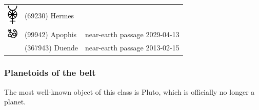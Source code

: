 \documentclass[british,final,landscape]{scrartcl}
\begin{document}
\begin{refsection}
\begin{supertabular}{p{0.3\textwidth}p{0.34\textwidth}p{0.34\textwidth}}
    \includegraphics[width=5mm]{Astrology/Hermes}     & (69230) Hermes    & \\
    \includegraphics[width=5mm]{Astrology/Apophis}    & (99942) Apophis   & near-earth passage 2029-04-13 \\
                                                      & (367943) Duende   & near-earth passage 2013-02-15 \\
    \end{supertabular}


\subsubsection{Planetoids of the  belt}

The most well-known object of this class is Pluto, which is officially no longer a planet.


\end{refsection}
\end{document}
